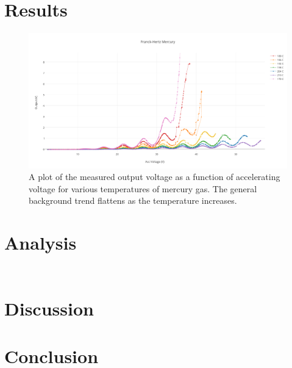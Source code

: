 \documentclass[prb,preprint]{revtex4-1}
\begin{document}
\section{Results}
\begin{figure}[h!]
\centering
\includegraphics[width=6in]{alltemps.pdf}
\caption{A plot of the measured output voltage as a function of accelerating voltage for various temperatures of mercury gas. The general background trend flattens as the temperature increases.}
\label{alltemps}
\end{figure}

\section{Analysis}

\begin{table}[h!]
\centering
\caption{ }
\begin{ruledtabular}
\begin{tabular}{lc}
     
\end{tabular}
\end{ruledtabular}
\label{parameters}
\end{table}


\section{Discussion}


\section{Conclusion}

\begin{thebibliography}{3}

\end{thebibliography}
\end{document}
